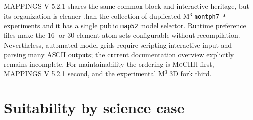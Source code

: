 \documentclass[english,a4paper]{my_memo}
\newcommand{\code}[1]{\texttt{#1}}
\newcommand{\MoCHII}{\textsc{MoCHII}}
\newcommand{\Mthree}{M$^3$}
\newcommand{\Mappings}{MAPPINGS V 5.2.1}
\begin{document}
\Mappings{} shares the same common-block and interactive heritage, but its
organization is cleaner than the collection of duplicated \Mthree{}
\code{montph7\_*} experiments and it has a single public \code{map52}
model selector.  Runtime preference files make the 16- or 30-element atom
sets configurable without recompilation.  Nevertheless, automated model
grids require scripting interactive input and parsing many ASCII outputs;
the current documentation overview explicitly remains incomplete.  For
maintainability the ordering is \MoCHII{} first, \Mappings{} second, and
the experimental \Mthree{} 3D fork third.

\section{Suitability by science case}
\end{document}
